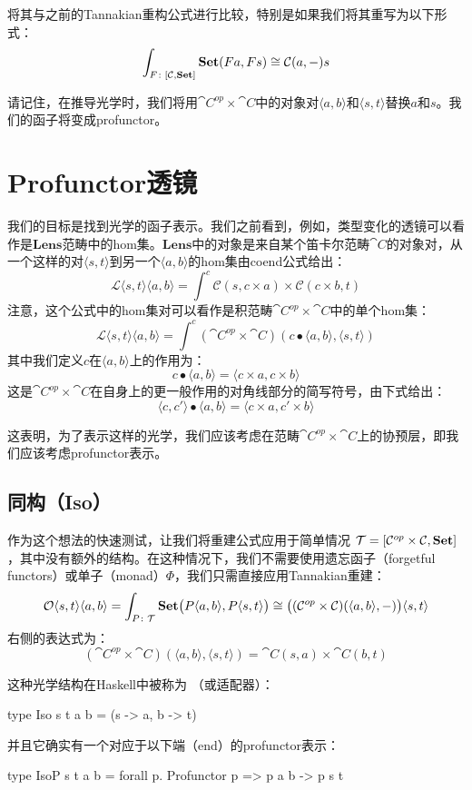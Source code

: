 \documentclass[DaoFP]{subfiles}
\begin{document}
将其与之前的Tannakian重构公式进行比较，特别是如果我们将其重写为以下形式：
\[ \int_{F \colon [\mathcal{C}, \mathbf{Set}]} \mathbf{Set} (F a, F s) \cong \mathcal{C}(a, -) s\]

请记住，在推导光学时，我们将用$\cat C^{op} \times \cat C$中的对象对$\langle a, b \rangle$和$\langle s, t \rangle$替换$a$和$s$。我们的函子将变成profunctor。

\section{Profunctor透镜}

我们的目标是找到光学的函子表示。我们之前看到，例如，类型变化的透镜可以看作是$\mathbf{Lens}$范畴中的hom集。$\mathbf{Lens}$中的对象是来自某个笛卡尔范畴$\cat C$的对象对，从一个这样的对$\langle s, t \rangle$到另一个$\langle a, b \rangle$的hom集由coend公式给出：
\[ \mathcal{L}\langle s, t\rangle \langle a, b \rangle = \int^{c} \mathcal{C}(s, c \times a) \times  \mathcal{C}(c \times b, t) \]
注意，这个公式中的hom集对可以看作是积范畴$\cat C^{op} \times \cat C$中的单个hom集：
\[  \mathcal{L}\langle s, t\rangle \langle a, b \rangle =  \int^{c} (\cat C^{op} \times \cat C )(c \bullet \langle a, b \rangle, \langle s, t \rangle)  \]
其中我们定义$c$在$\langle a, b \rangle$上的作用为：
\[ c \bullet \langle a, b \rangle = \langle c \times a, c \times b \rangle \]
这是$\cat C^{op} \times \cat C$在自身上的更一般作用的对角线部分的简写符号，由下式给出：
 \[ \langle c, c' \rangle \bullet \langle a, b \rangle = \langle c \times a, c' \times b \rangle \]

这表明，为了表示这样的光学，我们应该考虑在范畴$\cat C^{op} \times \cat C$上的协预层，即我们应该考虑profunctor表示。

\subsection{同构（Iso）}
作为这个想法的快速测试，让我们将重建公式应用于简单情况 $\mathcal{T} = [\mathcal{C}^{op} \times \mathcal{C}, \mathbf{Set}]$，其中没有额外的结构。在这种情况下，我们不需要使用遗忘函子（forgetful functors）或单子（monad）$\Phi$，我们只需直接应用Tannakian重建：
\[  \mathcal{O}\langle s, t\rangle \langle a, b \rangle =\int_{P \colon \mathcal{T}} \mathbf{Set} \big(P \langle a, b\rangle, P \langle s, t\rangle \big) \cong \big( (\mathcal{C}^{op} \times \mathcal{C}) (\langle a, b\rangle ,-) \big) \langle s, t\rangle \]
右侧的表达式为：
\[ (\cat C^{op} \times \cat C) (\langle a, b\rangle , \langle s, t\rangle) = \cat C (s, a) \times \cat C (b, t) \]

这种光学结构在Haskell中被称为 （或适配器）：
\begin{haskell}
type Iso s t a b = (s -> a, b -> t)
\end{haskell}
并且它确实有一个对应于以下端（end）的profunctor表示：
\begin{haskell}
type IsoP s t a b = forall p. Profunctor p => p a b -> p s t
\end{haskell}
\end{document}
